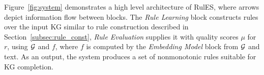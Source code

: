 Figure~\ref{fig:system} demonstrates a high level architecture of RulES, where arrows depict information flow between blocks.
The \emph{Rule Learning} block constructs rules over the input KG similar to rule construction described in Section~\ref{subsec:rule_const}, \emph{Rule Evaluation} supplies it with quality scores $\mu$ for $r$, using $\mathcal{G}$ and $f$, where $f$ is computed by the \emph{Embedding Model} block from $\mathcal{G}$ and text. As an output, the system produces a set of nonmonotonic rules suitable for KG completion.



 

